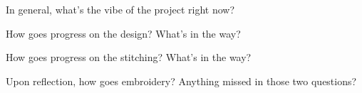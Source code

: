 
			\item In general, what's the vibe of the project right now?
	
			\item How goes progress on the design? What's in the way?
	
			\item How goes progress on the stitching? What's in the way?
				
			\item Upon reflection, how goes embroidery? Anything missed in those two questions?
